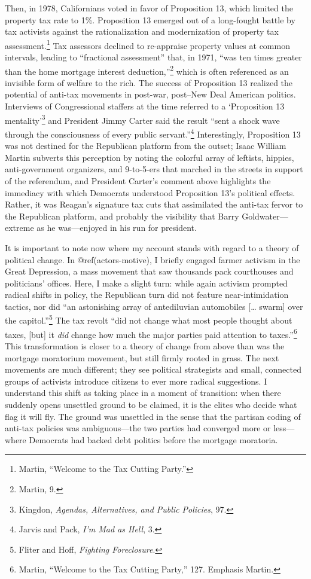 \documentclass[
]{article}
\let\rmarkdownfootnote\footnote%
\def\footnote{\protect\rmarkdownfootnote}
\begin{document}
Then, in 1978, Californians voted in favor of Proposition 13, which
limited the property tax rate to 1\%. Proposition 13 emerged out of a
long-fought battle by tax activists against the rationalization and
modernization of property tax assessment.\footnote{Martin, ``Welcome to
  the Tax Cutting Party.''} Tax assessors declined to re-appraise
property values at common intervals, leading to ``fractional
assessment'' that, in 1971, ``was ten times greater than the home
mortgage interest deduction,''\footnote{Martin, 9.} which is often
referenced as an invisible form of welfare to the rich. The success of
Proposition 13 realized the potential of anti-tax movements in post-war,
post--New Deal American politics. Interviews of Congressional staffers
at the time referred to a `Proposition 13 mentality'\footnote{Kingdon,
  \emph{Agendas, Alternatives, and Public Policies}, 97.} and President
Jimmy Carter said the result ``sent a shock wave through the
consciousness of every public servant.''\footnote{Jarvis and Pack,
  \emph{I'm Mad as Hell}, 3.} Interestingly, Proposition 13 was not
destined for the Republican platform from the outset; Isaac William
Martin subverts this perception by noting the colorful array of
leftists, hippies, anti-government organizers, and 9-to-5-ers that
marched in the streets in support of the referendum, and President
Carter's comment above highlights the immediacy with which Democrats
understood Proposition 13's political effects. Rather, it was Reagan's
signature tax cuts that assimilated the anti-tax fervor to the
Republican platform, and probably the visibility that Barry
Goldwater---extreme as he was---enjoyed in his run for president.

It is important to note now where my account stands with regard to a
theory of political change. In @ref(actors-motive), I briefly engaged
farmer activism in the Great Depression, a mass movement that saw
thousands pack courthouses and politicians' offices. Here, I make a
slight turn: while again activism prompted radical shifts in policy, the
Republican turn did not feature near-intimidation tactics, nor did ``an
astonishing array of antediluvian automobiles {[}\ldots{} swarm{]} over
the capitol.''\footnote{Fliter and Hoff, \emph{Fighting Foreclosure}.}
The tax revolt ``did not change what most people thought about taxes,
{[}but{]} it \emph{did} change how much the major parties paid attention
to taxes.''\footnote{Martin, ``Welcome to the Tax Cutting Party,'' 127.
  Emphasis Martin.} This transformation is closer to a theory of change
from above than was the mortgage moratorium movement, but still firmly
rooted in grass. The next movements are much different; they see
political strategists and small, connected groups of activists introduce
citizens to ever more radical suggestions. I understand this shift as
taking place in a moment of transition: when there suddenly opens
unsettled ground to be claimed, it is the elites who decide what flag it
will fly. The ground was unsettled in the sense that the partisan coding
of anti-tax policies was ambiguous---the two parties had converged more
or less---where Democrats had backed debt politics before the mortgage
moratoria.
\end{document}
